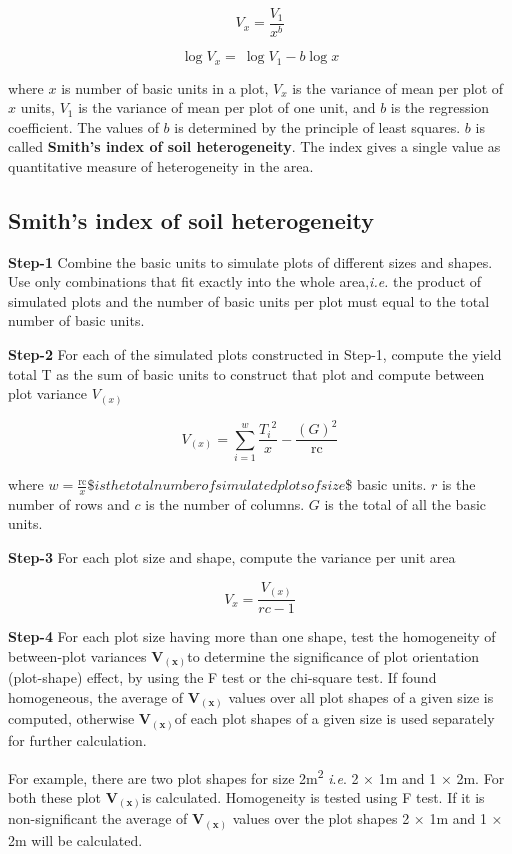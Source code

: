 \documentclass[
]{book}
\begin{document}
\[V_{x} = \frac{V_{1}}{x^{b}}\]

\[\log V_{x} = \ \log V_{1} - b\log x\]

where \(x\) is number of basic units in a plot, \(V_{x}\) is the variance of
mean per plot of \(x\) units, \(V_{1}\) is the variance of mean per plot of
one unit, and \(b\) is the regression coefficient. The values of \(b\) is
determined by the principle of least squares. \(b\) is called \textbf{Smith's
index of soil heterogeneity}. The index gives a single value as
quantitative measure of heterogeneity in the area.

\hypertarget{smith}{%
\subsection{Smith's index of soil heterogeneity}\label{smith}}

\textbf{Step-1} Combine the basic units to simulate plots of different sizes
and shapes. Use only combinations that fit exactly into the whole
area,\emph{i.e.} the product of simulated plots and the number of basic units
per plot must equal to the total number of basic units.

\textbf{Step-2} For each of the simulated plots constructed in Step-1,
compute the yield total T as the sum of basic units to construct that
plot and compute between plot variance \(V_{(x)}\)

\[V_{(x)} = \sum_{i = 1}^{w}\frac{{T_{i}}^{2}}{x} - \frac{\left( G \right)^{2}}{\text{rc}}\]

where
\(w = \frac{\text{rc}}{x}\$is the total number of simulated plots of size\)\$
basic units. \(r\) is the number of rows and \(c\) is the number of columns.
\(G\) is the total of all the basic units.

\textbf{Step-3} For each plot size and shape, compute the variance per unit
area

\[V_{x} = \frac{V_{(x)}}{rc - 1}\]

\textbf{Step-4} For each plot size having more than one shape, test the
homogeneity of between-plot variances
\(\mathbf{V}_{\left( \mathbf{x} \right)}\)to determine the significance of
plot orientation (plot-shape) effect, by using the F test or the
chi-square test. If found homogeneous, the average of
\(\mathbf{V}_{\mathbf{(x)}}\) values over all plot shapes of a given size
is computed, otherwise \(\mathbf{V}_{\mathbf{(x)}}\)of each plot shapes of
a given size is used separately for further calculation.

For example, there are two plot shapes for size 2m\textsuperscript{2} \emph{i}.\emph{e}. 2 × 1m
and 1 × 2m. For both these plot \(\mathbf{V}_{\mathbf{(x)}}\)is
calculated. Homogeneity is tested using F test. If it is non-significant
the average of \(\mathbf{V}_{\mathbf{(x)}}\) values over the plot shapes 2
× 1m and 1 × 2m will be calculated.
\end{document}

